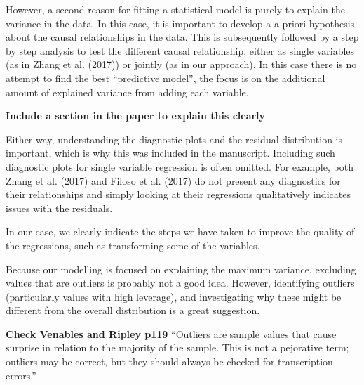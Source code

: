 \documentclass[]{elsarticle} %
\begin{document}
However, a second reason for fitting a statistical model is purely to explain the variance in the data. In this case, it is important to develop a a-priori hypothesis about the causal relationships in the data. This is subsequently followed by a step by step analysis to test the different causal relationship, either as single variables (as in Zhang et al. (2017)) or jointly (as in our approach). In this case there is no attempt to find the best ``predictive model'', the focus is on the additional amount of explained variance from adding each variable.

\textbf{Include a section in the paper to explain this clearly}

Either way, understanding the diagnostic plots and the residual distribution is important, which is why this was included in the manuscript. Including such diagnostic plots for single variable regression is often omitted. For example, both Zhang et al. (2017) and Filoso et al. (2017) do not present any diagnostics for their relationships and simply looking at their regressions qualitatively indicates issues with the residuals.

In our case, we clearly indicate the steps we have taken to improve the quality of the regressions, such as transforming some of the variables.

Because our modelling is focused on explaining the maximum variance, excluding values that are outliers is probably not a good idea. However, identifying outliers (particularly values with high leverage), and investigating why these might be different from the overall distribution is a great suggestion.

\textbf{Check Venables and Ripley p119}
``Outliers are sample values that cause surprise in relation to the majority of the sample. This is not a pejorative term; outliers may be correct, but they should always be checked for transcription errors.''
\end{document}
